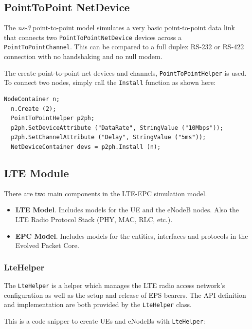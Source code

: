 \subsection{PointToPoint NetDevice}
The \textit{ns-3} point-to-point model simulates a very basic point-to-point data link that connects 
two \texttt{PointToPointNetDevice} devices across a \texttt{PointToPointChannel}. This can be compared to a 
full duplex RS-232 or RS-422 connection with no handshaking and no null modem.

The create point-to-point net devices and channels, \texttt{PointToPointHelper} is used. To
connect two nodes, simply call the \texttt{Install} function as shown here:

\begin{lstlisting}[language=myC++, caption={PointToPointHelper}, captionpos=b]
  NodeContainer n;
  n.Create (2);
  PointToPointHelper p2ph;
  p2ph.SetDeviceAttribute ("DataRate", StringValue ("10Mbps"));
  p2ph.SetChannelAttribute ("Delay", StringValue ("5ms"));
  NetDeviceContainer devs = p2ph.Install (n);
\end{lstlisting}


\subsection{LTE Module}
There are two main components in the LTE-EPC simulation model.

\begin{itemize}[topsep=0pt, noitemsep]
  \item \textbf{LTE Model}. Includes models for the UE and the eNodeB nodes. Also the LTE Radio Protocol
  Stack (PHY, MAC, RLC, etc.).

  \item \textbf{EPC Model}. Includes models for the entities, interfaces and protocols in the Evolved Packet Core.
\end{itemize}

\subsubsection{LteHelper}
The \texttt{LteHelper} is a helper which manages the LTE radio access network's 
configuration as well as the setup and release of EPS bearers. The API definition and 
implementation are both provided by the \texttt{LteHelper} class.

This is a code snipper to create UEs and eNodeBs with \texttt{LteHelper}:

